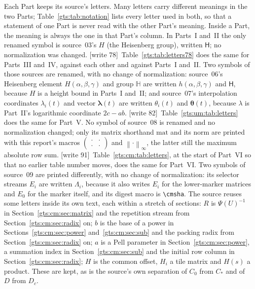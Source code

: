 \documentclass[11pt,letterpaper]{article}
\theoremstyle{definition}
\theoremstyle{remark}
\newcommand{\smallmat}[4]{\begin{pmatrix}#1&#2\\#3&#4\end{pmatrix}}
\newcommand{\HH}{\mathsf H}
\newcommand{\vv}{\boldsymbol\theta}
\newcommand{\umnorm}[1]{\left\lVert #1\right\rVert_\infty}
\newcommand{\cmsha}[1]{\par\noindent{\footnotesize\ttfamily\seqsplit{#1}}\par}
\newcommand{\wtagb}{\textup{[write 78]}}
\newcommand{\wtagc}{\textup{[write 82]}}
\newcommand{\wtagd}{\textup{[write 91]}}
\begin{document}
Each Part keeps its source's letters. Many letters carry different meanings in the two Parts; Table~\ref{gts:tab:notation} lists every letter used in both, so that a statement of one Part is never read with the other Part's meaning. Inside a Part, the meaning is always the one in that Part's column. In Parts~I and~II the only renamed symbol is source~03's $H$ (the Heisenberg group), written $\HH$; no normalization was changed. \wtagb\ Table~\ref{gts:tab:letters78} does the same for Parts~III and~IV, against each other and against Parts~I and~II. Two symbols of those sources are renamed, with no change of normalization: source~06's Heisenberg element $H(\alpha,\beta,\gamma)$ and group $\mathbb H$ are written $h(\alpha,\beta,\gamma)$ and $\HH$, because $H$ is a height bound in Parts~I and~II; and source~07's interpolation coordinates $\lambda_i(t)$ and vector $\boldsymbol\lambda(t)$ are written $\theta_i(t)$ and $\vv(t)$, because $\lambda$ is Part~II's logarithmic coordinate $2c-ab$. \wtagc\ Table~\ref{gts:um:tab:letters} does the same for Part~V. No symbol of source~08 is renamed and no normalization changed; only its matrix shorthand $\mathrm{mat}$ and its norm are printed with this report's macros $\smallmat{\cdot}{\cdot}{\cdot}{\cdot}$ and $\umnorm{\cdot}$, the latter still the maximum absolute row sum. \wtagd\ Table~\ref{gts:cm:tab:letters}, at the start of Part~VI so that no earlier table number moves, does the same for Part~VI. Two symbols of source~09 are printed differently, with no change of normalization: its selector streams $E_i$ are written $\Lambda_i$, because it also writes $E_i$ for the lower-marker matrices and $E_0$ for the marker itself, and its digest macro is \verb|\cmsha|. The source reuses some letters inside its own text, each within a stretch of sections: $R$ is $\Psi(U)^{-1}$ in Section~\ref{gts:cm:sec:matrix} and the repetition stream from Section~\ref{gts:cm:sec:radix} on; $b$ is the base of a power in Sections~\ref{gts:cm:sec:power} and~\ref{gts:cm:sec:sub} and the packing radix from Section~\ref{gts:cm:sec:radix} on; $a$ is a Pell parameter in Section~\ref{gts:cm:sec:power}, a summation index in Section~\ref{gts:cm:sec:sub} and the initial row column in Section~\ref{gts:cm:sec:radix}; $H$ is the common offset, $H_i$ a tile matrix and $H(s)$ a product. These are kept, as is the source's own separation of $C_0$ from $C_*$ and of $D$ from $D_c$.
\end{document}
